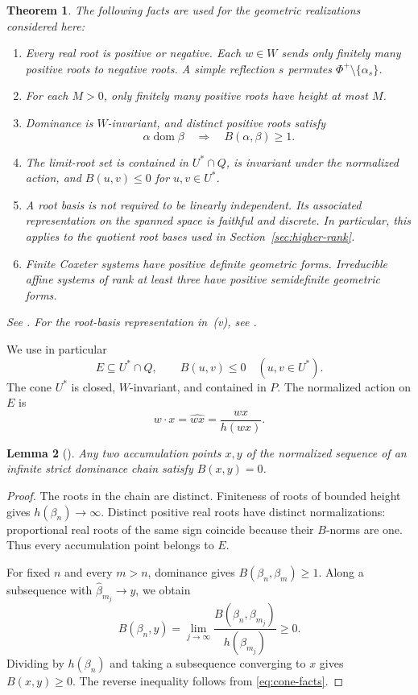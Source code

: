 \documentclass[11pt,reqno]{amsart}
\theoremstyle{plain}
\newtheorem{theorem}{Theorem}[section]
\newtheorem{lemma}[theorem]{Lemma}
\theoremstyle{definition}
\theoremstyle{remark}
\numberwithin{equation}{section}
\DeclareMathOperator{\dom}{dom}
\begin{document}
\begin{theorem}\label{thm:root-facts}
The following facts are used for the geometric realizations considered here:
\begin{enumerate}
\item Every real root is positive or negative. Each $w\in W$ sends only finitely many positive roots to negative roots. A simple reflection $s$ permutes $\Phi^+\setminus\{\alpha_s\}$.
\item For each $M>0$, only finitely many positive roots have height at most $M$.
\item Dominance is $W$-invariant, and distinct positive roots satisfy
\[
\alpha\dom\beta\quad\Longrightarrow\quad B(\alpha,\beta)\geq1.
\]
\item The limit-root set is contained in $U^*\cap Q$, is invariant under the normalized action, and $B(u,v)\leq0$ for $u,v\in U^*$.
\item A root basis is not required to be linearly independent. Its associated representation on the spanned space is faithful and discrete. In particular, this applies to the quotient root bases used in Section~\ref{sec:higher-rank}.
\item Finite Coxeter systems have positive definite geometric forms. Irreducible affine systems of rank at least three have positive semidefinite geometric forms.
\end{enumerate}
See \cite{DHR,Fu2013,FuEtAl2026,Krammer2009,Cashen}. For the root-basis representation in~(v), see \cite[Theorem~1.2.2 and Proposition~6.1.3]{Krammer2009}.
\end{theorem}

We use in particular
\begin{equation}\label{eq:cone-facts}
E\subseteq U^*\cap Q,\qquad B(u,v)\leq0\quad(u,v\in U^*).
\end{equation}
The cone $U^*$ is closed, $W$-invariant, and contained in $P$. The normalized action on $E$ is
\[
w\cdot x=\widehat{wx}=\frac{wx}{h(wx)}.
\]






\begin{lemma}[{\cite[Lemma ~4.1]{FuEtAl2026}}]\label{lem:orthogonality}
Any two accumulation points $x,y$ of the normalized sequence of an infinite strict dominance chain satisfy $B(x,y)=0$.
\end{lemma}
\begin{proof}
The roots in the chain are distinct. Finiteness of roots of bounded height gives $h(\beta_n)\to\infty$. Distinct positive real roots have distinct normalizations: proportional real roots of the same sign coincide because their $B$-norms are one. Thus every accumulation point belongs to $E$.

For fixed $n$ and every $m>n$, dominance gives $B(\beta_n,\beta_m)\geq1$. Along a subsequence with $\widehat{\beta}_{m_j}\to y$, we obtain
\[
B(\beta_n,y)=\lim_{j\to\infty}
\frac{B(\beta_n,\beta_{m_j})}{h(\beta_{m_j})}\geq0.
\]
Dividing by $h(\beta_n)$ and taking a subsequence converging to $x$ gives $B(x,y)\geq0$. The reverse inequality follows from \eqref{eq:cone-facts}.
\end{proof}
\end{document}
